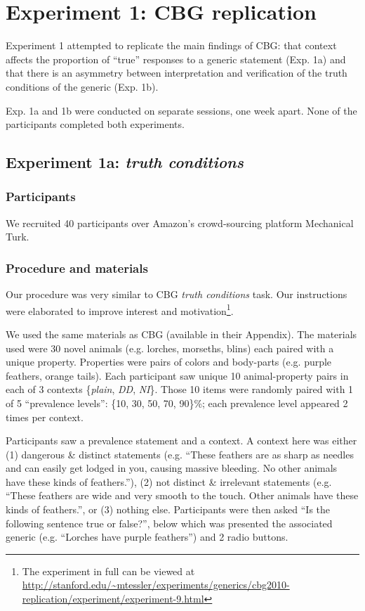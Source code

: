 \documentclass[10pt,letterpaper]{article}
\begin{document}
\section{Experiment 1: CBG replication}

Experiment 1 attempted to replicate the main findings of CBG: that context affects the proportion of ``true'' responses to a generic statement (Exp. 1a) and that there is an asymmetry between interpretation and verification of the truth conditions of the generic (Exp. 1b). 

Exp. 1a and 1b were conducted on separate sessions, one week apart. None of the participants completed both experiments.

\subsection{Experiment 1a: \emph{truth conditions}}

\subsubsection{Participants}

We recruited 40 participants over Amazon's crowd-sourcing platform Mechanical Turk.  

\subsubsection{Procedure and materials}

Our procedure was very similar to CBG \emph{truth conditions} task. Our instructions were elaborated to improve interest and motivation\footnote{The experiment in full can be viewed at \url{http://stanford.edu/~mtessler/experiments/generics/cbg2010-replication/experiment/experiment-9.html}}. 

We used the same materials as CBG (available in their Appendix). The materials used were 30 novel animals (e.g. lorches, morseths, blins) each paired with a unique property. Properties were pairs of colors and body-parts (e.g. purple feathers, orange tails). Each participant saw unique 10 animal-property pairs in each of 3 contexts \{\emph{plain}, \emph{DD}, \emph{NI}\}. Those 10 items were randomly paired with 1 of 5 ``prevalence levels'': \{10, 30, 50, 70, 90\}\%; each prevalence level appeared 2 times per context. 

Participants saw a prevalence statement and a context. A context here was either (1) dangerous \& distinct statements (e.g. ``These feathers are as sharp as needles and can easily get lodged in you, causing massive bleeding. No other animals have these kinds of feathers.''), (2) not distinct \& irrelevant statements (e.g. ``These feathers are wide and very smooth to the touch. Other animals have these kinds of feathers.'', or (3) nothing else. Participants were then asked ``Is the following sentence true or false?'', below which was presented the associated generic (e.g. ``Lorches have purple feathers'') and 2 radio buttons. 
\end{document}
